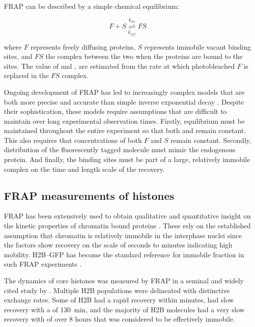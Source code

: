     FRAP can be described by a simple chemical equilibrium:

    \begin{displaymath}
      F + S \overset{k_{on}}{\underset{k_{off}}{\rightleftharpoons}} FS
    \end{displaymath}

    where $F$ represents freely diffusing proteins,
    $S$ represents immobile vacant binding sites,
    and $FS$ the complex between the two when the proteins are bound to the sites. 
    The value of \Kon{} and \Koff{},
    are estimated from the rate at which photobleached $F$ is replaced in the $FS$ complex.

    Ongoing development of FRAP has led to increasingly complex models
    that are both more precise and accurate than simple
    inverse exponential decay \citep{mcnally-frap-2010}.
    Despite their sophistication, these models require assumptions
    that are difficult to maintain over long experimental observation times.
    Firstly, equilibrium must be maintained throughout the entire experiment 
    so that both \Kon{} and \Koff{} remain constant.
    This also requires that concentrations of both $F$ and $S$ remain constant.
    Secondly, distribution of the fluorescently tagged molecule must mimic the endogenous protein.
    And finally, the binding sites must be part of a large, relatively immobile complex
    on the time and length scale of the recovery.

  \subsection{FRAP measurements of histones}

    FRAP has been extensively used to obtain qualitative and
    quantitative insight on the kinetic properties of chromatin bound
    proteins \citep{phair2000high, essers2005nuclear, agresti2005gr}.
    These rely on the established assumption that chromatin is
    relatively immobile in the interphase nuclei
    \citep{abney1997chromatin} since the factors show recovery
    on the scale of seconds to minutes indicating high mobility.
    H2B--GFP \citep{KevinH2BGFP} has become
    the standard reference for immobile fraction in such
    FRAP experiments \citep{dey2000bromodomain}.

    The dynamics of core histones was measured by FRAP in a seminal
    and widely cited study by \citep{KimuraCook}.  Multiple H2B
    populations were delineated with distinctive exchange rates.  Some
     of H2B had a rapid recovery within minutes, 
    had slow recovery with a \halflife[] of \SI{130}{\minute}, and the
    majority of H2B molecules had a very slow recovery with \halflife[] of
    over 8 hours that was considered to be effectively immobile.

